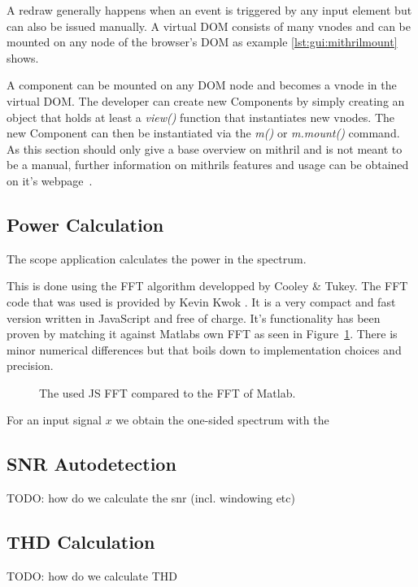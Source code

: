 A redraw generally happens when an event is triggered by any input element but can also be issued manually.
A virtual DOM consists of many vnodes and can be mounted on any node of the browser's DOM as example \ref{lst:gui:mithrilmount} shows.


A component can be mounted on any DOM node and becomes a vnode in the virtual DOM. The developer can create new Components by simply creating an object that holds at least a \textit{view()} function that instantiates new vnodes.
The new Component can then be instantiated via the \textit{m()} or \textit{m.mount()} command.
As this section should only give a base overview on mithril and is not meant to be a manual, further information on mithrils features and usage can be obtained on it's webpage~\cite{mithril:home}.

\subsection{Power Calculation}

The scope application calculates the power in the spectrum.

This is done using the FFT algorithm developped by Cooley \& Tukey. The FFT code that was used is provided by Kevin Kwok \cite{kwok}. It is a very compact and fast version written in JavaScript and free of charge. It's functionality has been proven by matching it against Matlabs own FFT as seen in Figure~\ref{fig:gui:fft_comparison}. There is minor numerical differences but that boils down to implementation choices and precision.

\begin{figure}
    \centering
    
    \caption[FFT comparison]{%
        The used JS FFT compared to the FFT of Matlab.%
    }
    \label{fig:gui:fft_comparison}
\end{figure}

For an input signal $x$ we obtain the one-sided spectrum with the 

\subsection{SNR Autodetection}

TODO: how do we calculate the snr (incl. windowing etc)

\subsection{THD Calculation}

TODO: how do we calculate THD


